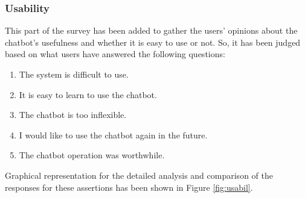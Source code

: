\subsubsection*{Usability}
This part of the survey has been added to gather the users' opinions about the chatbot's usefulness and whether it is easy to use or not. So, it has been judged based on what users have answered the following questions:
\begin{enumerate}
    \item The system is difficult to use.
    \item It is easy to learn to use the chatbot.
    \item The chatbot is too inflexible.
    \item I would like to use the chatbot again in the future.
    \item The chatbot operation was worthwhile.
\end{enumerate}
Graphical representation for the detailed analysis and comparison of the responses for these assertions has been shown in Figure \ref{fig:usabil}.

